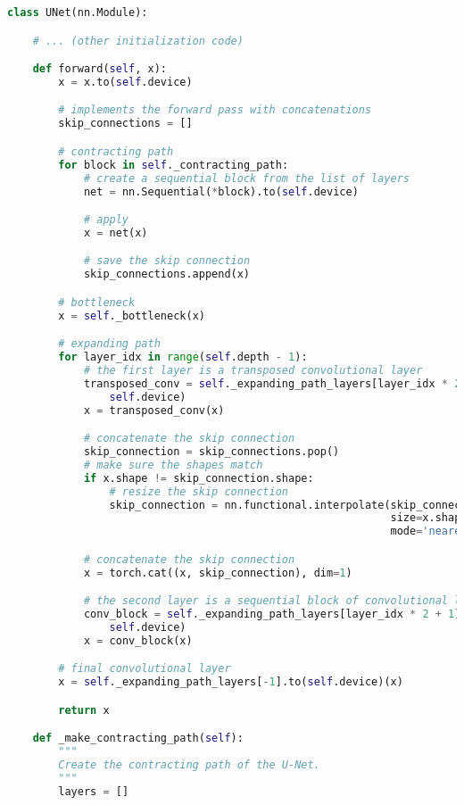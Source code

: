 \begin{lstlisting}[language=Python, caption={U-Net architecture for semantic segmentation}]
class UNet(nn.Module):

    # ... (other initialization code)

    def forward(self, x):
        x = x.to(self.device)

        # implements the forward pass with concatenations
        skip_connections = []

        # contracting path
        for block in self._contracting_path:
            # create a sequential block from the list of layers
            net = nn.Sequential(*block).to(self.device)

            # apply
            x = net(x)

            # save the skip connection
            skip_connections.append(x)

        # bottleneck
        x = self._bottleneck(x)

        # expanding path
        for layer_idx in range(self.depth - 1):
            # the first layer is a transposed convolutional layer
            transposed_conv = self._expanding_path_layers[layer_idx * 2].to(
                self.device)
            x = transposed_conv(x)

            # concatenate the skip connection
            skip_connection = skip_connections.pop()
            # make sure the shapes match
            if x.shape != skip_connection.shape:
                # resize the skip connection
                skip_connection = nn.functional.interpolate(skip_connection,
                                                            size=x.shape[2:],
                                                            mode='nearest')

            # concatenate the skip connection
            x = torch.cat((x, skip_connection), dim=1)

            # the second layer is a sequential block of convolutional layers
            conv_block = self._expanding_path_layers[layer_idx * 2 + 1].to(
                self.device)
            x = conv_block(x)

        # final convolutional layer
        x = self._expanding_path_layers[-1].to(self.device)(x)

        return x

    def _make_contracting_path(self):
        """
        Create the contracting path of the U-Net.
        """
        layers = []


\end{lstlisting}
